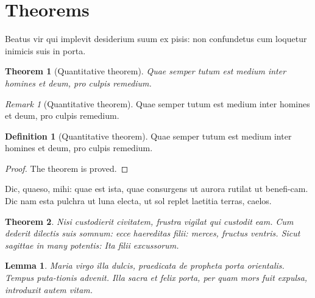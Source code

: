 \documentclass[linenumber]{jdsart}
\theoremstyle{plain}
\newtheorem{thm}{Theorem}
\newtheorem{lemma}{Lemma}
\theoremstyle{remark}
\newtheorem{remark}{Remark}
\theoremstyle{definition}
\newtheorem{defin}{Definition}
\begin{document}
\section{Theorems}

Beatus vir qui implevit desiderium
suum ex pisis: non confundetus cum loquetur inimicis suis in porta.


\begin{thm}[Quantitative theorem] Quae semper tutum est medium inter homines et deum,
pro culpis remedium.
\end{thm}

\begin{remark}[Quantitative theorem] Quae semper tutum est medium inter homines et deum,
pro culpis remedium.
\end{remark}

\begin{defin}[Quantitative theorem] Quae semper tutum est medium inter homines et deum,
pro culpis remedium.
\end{defin}

\begin{proof}
The theorem is proved.
\end{proof}

Dic, quaeso, mihi: quae est ista, quae consurgens ut aurora rutilat
ut benefi-cam.  Dic nam esta pulchra ut luna electa, ut sol replet
laetitia terras, caelos.

\begin{thm}
Nisi custodierit civitatem,
frustra vigilat qui custodit eam. Cum dederit dilectis suis somnum:
ecce haereditas filii: merces, fructus ventris. Sicut sagittae in
many potentis: Ita filii excussorum.
\end{thm}

\begin{lemma}
Maria virgo illa dulcis, praedicata de
propheta porta orientalis. Tempus puta-tionis advenit. Illa sacra et
felix porta, per quam mors fuit expulsa, introduxit autem vitam.
\end{lemma}

\begin{esm}
\end{esm}
\end{document}
